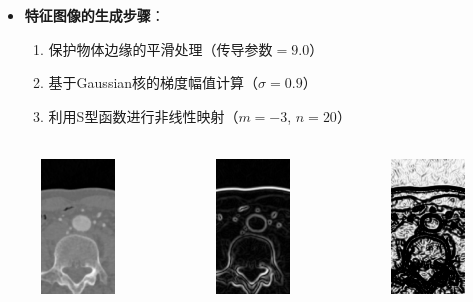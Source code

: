 \begin{frame}
\begin{itemize}
  \item \textbf{特征图像的生成步骤}：
  \begin{enumerate}
    \item 保护物体边缘的平滑处理（$\text{传导参数} = 9.0$）
    \item 基于Gaussian核的梯度幅值计算（$\sigma = 0.9$）
    \item 利用S型函数进行非线性映射（$m = -3$, $n = 20$）
  \end{enumerate}
\end{itemize}
\begin{columns}[b,onlytextwidth]
\begin{column}{.3\textwidth}
\begin{figure}[t]
\centering
\includegraphics[height=1.5in]{../../Figures/gac/dcm_smoothing.eps}
\end{figure}
\end{column}
\begin{column}{.3\textwidth}
\begin{figure}[t]
\centering
\includegraphics[height=1.5in]{../../Figures/gac/dcm_gradient.eps}
\end{figure}
\end{column}
\begin{column}{.3\textwidth}
\begin{figure}[t]
\centering
\includegraphics[height=1.5in]{../../Figures/gac/dcm_sigmoid.eps}
\end{figure}
\end{column}
\end{columns}
\end{frame}

